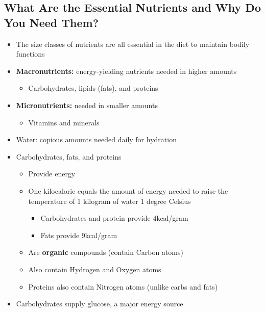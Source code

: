 \documentclass[12pt]{article}
\begin{document}
        \subsection{What Are the Essential Nutrients and Why Do You Need Them?}
            \begin{itemize}
                \item The size classes of nutrients are all essential in the diet to maintain bodily functions
                \item \textbf{Macronutrients:} energy-yielding nutrients needed in higher amounts
                    \begin{itemize}
                        \item Carbohydrates, lipids (fats), and proteins
                    \end{itemize}
                \item \textbf{Micronutrients:} needed in smaller amounts
                    \begin{itemize}
                        \item Vitamins and minerals
                    \end{itemize}
                \item Water: copious amounts needed daily for hydration
                \item Carbohydrates, fats, and proteins
                    \begin{itemize}
                        \item Provide energy
                        \item One kilocalorie equals the amount of energy needed to raise the temperature of 1 kilogram of water 1 degree Celsius
                            \begin{itemize}
                                \item Carbohydrates and protein provide 4kcal/gram
                                \item Fats provide 9kcal/gram
                            \end{itemize}
                        \item Are \textbf{organic} compounds (contain Carbon atoms)
                        \item Also contain Hydrogen and Oxygen atoms
                        \item Proteins also contain Nitrogen atoms (unlike carbs and fats)
                    \end{itemize}
                \item Carbohydrates supply glucose, a major energy source

\end{itemize}
\end{document}
